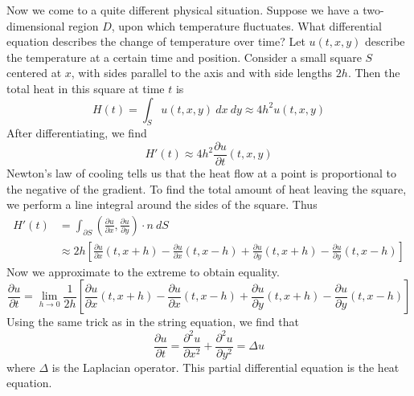 Now we come to a quite different physical situation. Suppose we have a two-dimensional region $D$, upon which temperature fluctuates. What differential equation describes the change of temperature over time? Let $u(t,x,y)$ describe the temperature at a certain time and position. Consider a small square $S$ centered at $x$, with sides parallel to the axis and with side lengths $2h$. Then the total heat in this square at time $t$ is
%
\[ H(t) = \int_S u(t,x,y)\ dx\ dy \approx 4h^2 u(t,x,y) \]
%
After differentiating, we find
%
\[ H'(t) \approx 4h^2 \frac{\partial u}{\partial t}(t,x,y) \]
%
Newton's law of cooling tells us that the heat flow at a point is proportional to the negative of the gradient. To find the total amount of heat leaving the square, we perform a line integral around the sides of the square. Thus
%
\begin{align*} H'(t) &= \int_{\partial S} \left( \frac{\partial u}{\partial x}, \frac{\partial u}{\partial y} \right) \cdot n\ dS\\
&\approx 2h \left[\frac{\partial u}{\partial x}(t,x+h) - \frac{\partial u}{\partial x}(t,x-h) + \frac{\partial u}{\partial y}(t,x+h) - \frac{\partial u}{\partial y}(t,x-h)\right] \end{align*}
%
Now we approximate to the extreme to obtain equality.
%
\[ \frac{\partial u}{\partial t} = \lim_{h \to 0} \frac{1}{2h} \left[\frac{\partial u}{\partial x}(t,x+h) - \frac{\partial u}{\partial x}(t,x-h) + \frac{\partial u}{\partial y}(t,x+h) - \frac{\partial u}{\partial y}(t,x-h)\right] \]
%
Using the same trick as in the string equation, we find that
%
\[ \frac{\partial u}{\partial t} = \frac{\partial^2 u}{\partial x^2} + \frac{\partial^2 u}{\partial y^2} = \Delta u \]
%
where $\Delta$ is the Laplacian operator. This partial differential equation is the heat equation.

